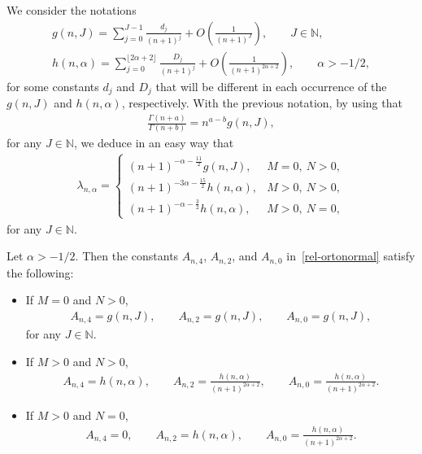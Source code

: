 We consider the notations
\begin{gather*}%
g(n,J)=\sum_{j=0}^{J-1}\frac{d_j}{(n+1)^{j}}+O\left(\frac{1}{(n+1)^J}\right), \qquad J\in \mathbb{N},\\
h(n,\alpha)=\sum_{j=0}^{\lfloor 2\alpha+2 \rfloor}\frac{D_j}{(n+1)^{j}}+O\left(\frac{1}{(n+1)^{2\alpha+2}}\right), \qquad \alpha>-1/2,
\end{gather*}
for some constants $d_j$ and $D_j$ that will be different in each occurrence of the $g(n,J)$ and $h(n,\alpha)$, respectively. With the previous notation, by using that
\begin{gather}\label{ec:gamma-ratio}
\frac{\Gamma(n+a)}{\Gamma(n+b)}=n^{a-b}g(n,J),
\end{gather}
for any $J\in \mathbb{N}$, we deduce in an easy way that
\begin{gather}\label{lambda_n}
\lambda_{n,\alpha}= \begin{cases}
(n+1)^{-\alpha-\frac{11}{2}}g(n,J), & M=0, \ N>0,\\
(n+1)^{-3\alpha-\frac{15}{2}}h(n,\alpha), & M>0, \ N>0,\\
(n+1)^{-\alpha-\frac{3}{2}}h(n,\alpha), & M>0, \ N=0,
\end{cases}
\end{gather}
for any $J\in \mathbb{N}$.

\begin{lem}\label{A_nB_nC_n} Let $\alpha>-1/2$. Then the constants $A_{n,4}$, $A_{n,2}$, and $A_{n,0}$ in~\eqref{rel-ortonormal} satisfy the following:
	\begin{itemize}\itemsep=0pt
		\item [$i)$] If $M=0$ and $N>0$,
		\begin{gather*}
		A_{n,4}=g(n,J),\qquad A_{n,2}= g(n,J),\qquad A_{n,0}= g(n,J),
		\end{gather*}
for any $J\in \mathbb{N}$.
		\item [$ii)$] If $M>0$ and $N>0$,
		\begin{gather*}
		A_{n,4}= h(n,\alpha),\qquad A_{n,2}=\frac{h(n,\alpha)}{(n+1)^{2\alpha+2}},\qquad A_{n,0}=\frac{h(n,\alpha)}{(n+1)^{2\alpha+2}}.
		\end{gather*}
		\item [$iii)$] If $M>0$ and $N=0$,
		\begin{gather*}
		A_{n,4}=0,\qquad A_{n,2}=h(n,\alpha),\qquad A_{n,0}=\frac{h(n,\alpha)}{(n+1)^{2\alpha+2}}.
		\end{gather*}
	\end{itemize}
\end{lem}

